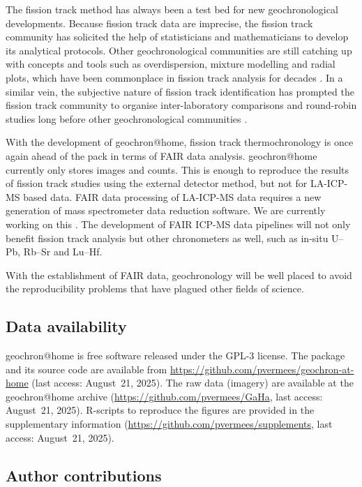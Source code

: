 \documentclass{article}
\begin{document}
The fission track method has always been a test bed for new
geochronological developments.  Because fission track data are
imprecise, the fission track community has solicited the help of
statisticians and mathematicians to develop its analytical protocols.
Other geochronological communities are still catching up with concepts
and tools such as overdispersion, mixture modelling and radial plots,
which have been commonplace in fission track analysis for decades
\citep{vermeesch2019b}. In a similar vein, the subjective nature of
fission track identification has prompted the fission track community
to organise inter-laboratory comparisons and round-robin studies long
before other geochronological communities
\citep{miller1985,tamer2025}.\medskip

With the development of geochron@home, fission track thermochronology
is once again ahead of the pack in terms of FAIR data analysis.
geochron@home currently only stores images and counts. This is enough
to reproduce the results of fission track studies using the external
detector method, but not for LA-ICP-MS based data. FAIR data
processing of LA-ICP-MS data requires a new generation of mass
spectrometer data reduction software. We are currently working on this
\citep{vermeesch2025b}. The development of FAIR ICP-MS data pipelines
will not only benefit fission track analysis but other chronometers as
well, such as in-situ U--Pb, Rb--Sr and Lu--Hf.\medskip

With the establishment of FAIR data, geochronology will be well placed
to avoid the reproducibility problems that have plagued other fields
of science.

\subsection*{Data availability}

geochron@home is free software released under the GPL-3 license. The
package and its source code are available from
\url{https://github.com/pvermees/geochron-at-home} (last access:
August~21, 2025).  The raw data (imagery) are available at the
geochron@home archive (\url{https://github.com/pvermees/GaHa}, last
access: August~21, 2025).  R-scripts to reproduce the figures are
provided in the supplementary information
(\url{https://github.com/pvermees/supplements}, last access:
August~21, 2025).

\subsection*{Author contributions}
\end{document}
